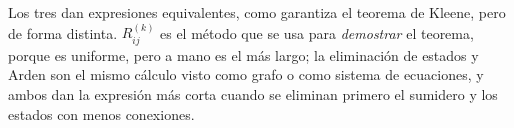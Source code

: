 Los tres dan expresiones equivalentes, como garantiza el teorema de Kleene, pero de forma distinta. \(R_{ij}^{(k)}\) es el método que se usa para \emph{demostrar} el teorema, porque es uniforme, pero a mano es el más largo; la eliminación de estados y Arden son el mismo cálculo visto como grafo o como sistema de ecuaciones, y ambos dan la expresión más corta cuando se eliminan primero el sumidero y los estados con menos conexiones.
